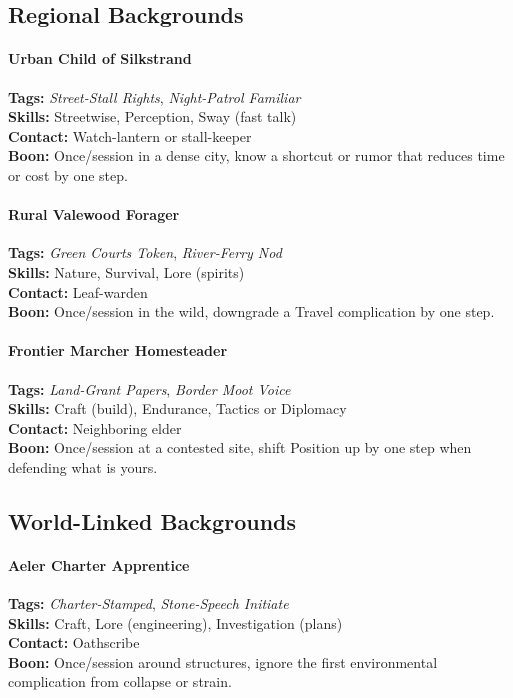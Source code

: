 \subsection*{Regional Backgrounds}

\paragraph{Urban Child of Silkstrand}
\textbf{Tags:} \textit{Street-Stall Rights}, \textit{Night-Patrol Familiar} \\
\textbf{Skills:} Streetwise, Perception, Sway (fast talk) \\
\textbf{Contact:} Watch-lantern or stall-keeper \\
\textbf{Boon:} Once/session in a dense city, know a shortcut or rumor that reduces time or cost by one step.

\paragraph{Rural Valewood Forager}
\textbf{Tags:} \textit{Green Courts Token}, \textit{River-Ferry Nod} \\
\textbf{Skills:} Nature, Survival, Lore (spirits) \\
\textbf{Contact:} Leaf-warden \\
\textbf{Boon:} Once/session in the wild, downgrade a Travel complication by one step.

\paragraph{Frontier Marcher Homesteader}
\textbf{Tags:} \textit{Land-Grant Papers}, \textit{Border Moot Voice} \\
\textbf{Skills:} Craft (build), Endurance, Tactics or Diplomacy \\
\textbf{Contact:} Neighboring elder \\
\textbf{Boon:} Once/session at a contested site, shift Position up by one step when defending what is yours.

\subsection*{World-Linked Backgrounds}

\paragraph{Aeler Charter Apprentice}
\textbf{Tags:} \textit{Charter-Stamped}, \textit{Stone-Speech Initiate} \\
\textbf{Skills:} Craft, Lore (engineering), Investigation (plans) \\
\textbf{Contact:} Oathscribe \\
\textbf{Boon:} Once/session around structures, ignore the first environmental complication from collapse or strain.

